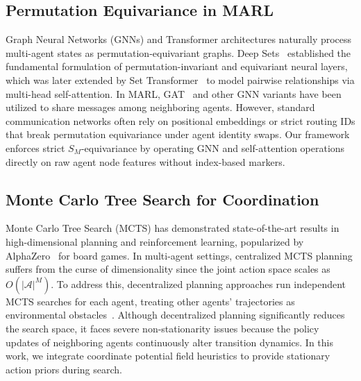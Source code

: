 \documentclass[11pt,a4paper]{article}
\begin{document}
\subsection{Permutation Equivariance in MARL}
Graph Neural Networks (GNNs) and Transformer architectures naturally process multi-agent states as permutation-equivariant graphs. Deep Sets~\cite{zaheer2017deep} established the fundamental formulation of permutation-invariant and equivariant neural layers, which was later extended by Set Transformer~\cite{lee2019set} to model pairwise relationships via multi-head self-attention. In MARL, GAT~\cite{velickovic2018graph} and other GNN variants have been utilized to share messages among neighboring agents. However, standard communication networks often rely on positional embeddings or strict routing IDs that break permutation equivariance under agent identity swaps. Our framework enforces strict $S_M$-equivariance by operating GNN and self-attention operations directly on raw agent node features without index-based markers.

\subsection{Monte Carlo Tree Search for Coordination}
Monte Carlo Tree Search (MCTS) has demonstrated state-of-the-art results in high-dimensional planning and reinforcement learning, popularized by AlphaZero~\cite{silver2017mastering} for board games. In multi-agent settings, centralized MCTS planning suffers from the curse of dimensionality since the joint action space scales as $O(|\mathcal{A}|^M)$. To address this, decentralized planning approaches run independent MCTS searches for each agent, treating other agents' trajectories as environmental obstacles~\cite{kocsis2006bandit}. Although decentralized planning significantly reduces the search space, it faces severe non-stationarity issues because the policy updates of neighboring agents continuously alter transition dynamics. In this work, we integrate coordinate potential field heuristics to provide stationary action priors during search.
\end{document}
